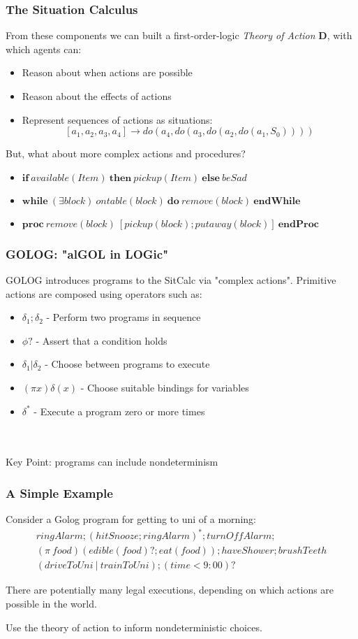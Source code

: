\documentclass{beamer}
\begin{document}
\begin{frame}
\frametitle{The Situation Calculus}
From these components we can built a first-order-logic \emph{Theory of Action}
$\mathbf{D}$, with which agents can:
\begin{itemize}
  \item Reason about when actions are possible
  \item Reason about the effects of actions
  \item Represent sequences of actions as situations:\[
\left[a_1, a_2, a_3, a_4\right] \rightarrow do(a_4,do(a_3,do(a_2,do(a_1,S_0))))
\]
\end{itemize}
\pause
But, what about more complex actions and procedures?
\begin{itemize}
  \item $\mathbf{if}\ available(Item)\ \mathbf{then}\ pickup(Item)\ \mathbf{else}\ beSad$
  \item $\mathbf{while}\ (\exists block)\ ontable(block)\ \mathbf{do}\ remove(block)\ \mathbf{endWhile}$
  \item $\mathbf{proc}\ remove(block)\ [pickup(block);putaway(block)]\ \mathbf{endProc}$
\end{itemize}
\end{frame}

\begin{frame}
\frametitle{GOLOG: "alGOL in LOGic"}
GOLOG introduces programs to the SitCalc via "complex actions".
Primitive actions are composed using operators such as:

\begin{itemize}
  \pause
  \item $\delta_1;\delta_2$ - Perform two programs in sequence
  \pause
  \item $\phi?$ - Assert that a condition holds
  \pause
  \item $\delta_1|\delta_2$ - Choose between programs to execute
  \pause
  \item $(\pi x)\delta(x)$ - Choose suitable bindings for variables
  \pause
  \item $\delta^*$ - Execute a program zero or more times
\end{itemize}
\ \\
\ \\
\pause
Key Point:  programs can include \alert{nondeterminism}
\end{frame}

\begin{frame}
\frametitle{A Simple Example}
Consider a Golog program for getting to uni of a morning:\[
\begin{array}{c}
ringAlarm;(hitSnooze; ringAlarm)^*;turnOffAlarm;\\
(\pi\ food)(edible(food)?;eat(food)); haveShower; brushTeeth\\
(driveToUni\ |\ trainToUni); (time<9:00)?
\end{array}\]

There are potentially many legal executions, depending on which actions
are possible in the world.

Use the theory of action to inform nondeterministic choices.
\end{frame}
\end{document}
